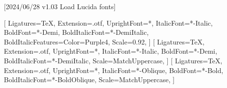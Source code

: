 
[2024/06/28 v1.03 Load Lucida fonts]



\ifpdftex
	\RequirePackage[LY1]{fontenc}
	\RequirePackage{bm}
\else
    \RequirePackage[warnings-off={mathtools-colon,mathtools-overbracket}]{unicode-math}

    
    \setmainfont{LucidaBrightOT}[%
          Ligatures=TeX,
          Extension=.otf,
          UprightFont=*,
          ItalicFont=*-Italic,
          BoldFont=*-Demi,
    	  BoldItalicFont=*-DemiItalic,
          BoldItalicFeatures={Color=Purple4},
    	  Scale=0.92,
      ]
    \setsansfont{LucidaSansOT}[%
          Ligatures=TeX,
          Extension=.otf,
          UprightFont=*,
          ItalicFont=*-Italic,
          BoldFont=*-Demi,
    	  BoldItalicFont=*-DemiItalic,
    	  Scale=MatchUppercase,
      ]
    \setmonofont{LucidaSansTypewriterOT}[%
          Ligatures=TeX,
          Extension=.otf,
          UprightFont=*,
          ItalicFont=*-Oblique,
          BoldFont=*-Bold,
          BoldItalicFont=*-BoldOblique,
      	  Scale=MatchUppercase,
      ]
    
